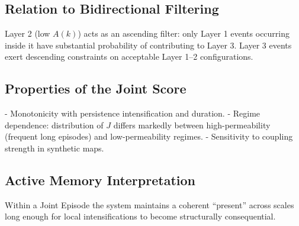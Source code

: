 \subsection{Relation to Bidirectional Filtering}

Layer 2 (low $A(k)$) acts as an ascending filter: only Layer 1 events occurring inside it have substantial probability of contributing to Layer 3. Layer 3 events exert descending constraints on acceptable Layer 1–2 configurations.

\subsection{Properties of the Joint Score}

- Monotonicity with persistence intensification and duration.
- Regime dependence: distribution of $J$ differs markedly between high-permeability (frequent long episodes) and low-permeability regimes.
- Sensitivity to coupling strength in synthetic maps.

\subsection{Active Memory Interpretation}

Within a Joint Episode the system maintains a coherent “present” across scales long enough for local intensifications to become structurally consequential.
